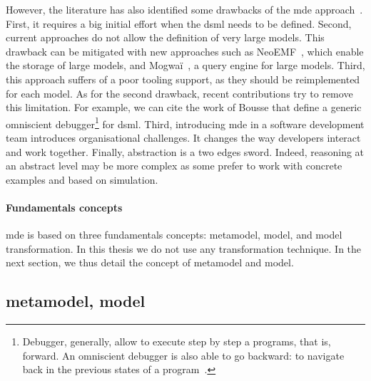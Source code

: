 However, the literature has also identified some drawbacks of the \gls{mde} approach~\cite{DBLP:conf/ifm/Kent02, DBLP:conf/uml/BakerLW05, DBLP:conf/models/WhittleHRBH13, DBLP:conf/icse/HutchinsonRW11}.
First, it requires a big initial effort when the \gls{dsml} needs to be defined.
Second, current approaches do not allow the definition of very large \glspl{model}.
This drawback can be mitigated with new approaches such as NeoEMF~\cite{DBLP:conf/ecmdafa/BenelallamGSTL14, DBLP:journals/scp/DanielSBTVGC17}, which enable the storage of large \glspl{model},  and Mogwaï~\cite{DBLP:conf/rcis/DanielSC16}, a query engine for large \glspl{model}.
Third, this approach suffers of a poor tooling support, as they should be reimplemented for each \gls{model}.
As for the second drawback, recent contributions try to remove this limitation.
For example, we can cite the work of Bousse \etal \cite{DBLP:journals/jss/BousseLCWB18} that define a generic omniscient debugger\footnote{Debugger, generally, allow to execute step by step a programs, that is, forward. An omniscient debugger is also able to go backward: to navigate back in the previous states of a program~\cite{DBLP:journals/corr/cs-SE-0310016}.} for \gls{dsml}.
Third, introducing \gls{mde} in a software development team introduces organisational challenges.
It changes the way developers interact and work together.
Finally, abstraction is a two edges sword.
Indeed, reasoning at an abstract level may be more complex as some prefer to work with concrete examples and based on simulation.

\paragraph{Fundamentals concepts}
\gls{mde} is based on three fundamentals concepts: \gls{metamodel}, \gls{model}, and model transformation.
In this thesis we do not use any transformation technique.
In the next section, we thus detail the concept of \gls{metamodel} and \gls{model}.

\subsection[Metamodel, model]{\Gls{metamodel}, \gls{model}}

